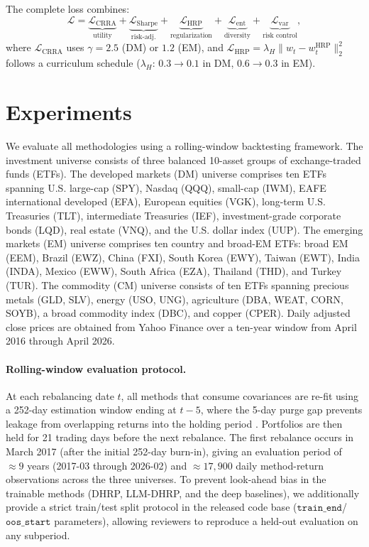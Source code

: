 The complete loss combines:
\begin{equation}
\mathcal{L} = \underbrace{\mathcal{L}_{\text{CRRA}}}_{\text{utility}} + \underbrace{\mathcal{L}_{\text{Sharpe}}}_{\text{risk-adj.}} + \underbrace{\mathcal{L}_{\text{HRP}}}_{\text{regularization}} + \underbrace{\mathcal{L}_{\text{ent}}}_{\text{diversity}} + \underbrace{\mathcal{L}_{\text{var}}}_{\text{risk control}},
\end{equation}
where $\mathcal{L}_{\text{CRRA}}$ uses $\gamma = 2.5$ (DM) or $1.2$ (EM), and $\mathcal{L}_{\text{HRP}} = \lambda_H \|w_t - w_t^{\text{HRP}}\|_2^2$ follows a curriculum schedule ($\lambda_H$: $0.3 \to 0.1$ in DM, $0.6 \to 0.3$ in EM).

\section{Experiments}

We evaluate all methodologies using a rolling-window backtesting framework. The investment universe consists of three balanced 10-asset groups of exchange-traded funds (ETFs). The developed markets (DM) universe comprises ten ETFs spanning U.S. large-cap (SPY), Nasdaq (QQQ), small-cap (IWM), EAFE international developed (EFA), European equities (VGK), long-term U.S. Treasuries (TLT), intermediate Treasuries (IEF), investment-grade corporate bonds (LQD), real estate (VNQ), and the U.S. dollar index (UUP). The emerging markets (EM) universe comprises ten country and broad-EM ETFs: broad EM (EEM), Brazil (EWZ), China (FXI), South Korea (EWY), Taiwan (EWT), India (INDA), Mexico (EWW), South Africa (EZA), Thailand (THD), and Turkey (TUR). The commodity (CM) universe consists of ten ETFs spanning precious metals (GLD, SLV), energy (USO, UNG), agriculture (DBA, WEAT, CORN, SOYB), a broad commodity index (DBC), and copper (CPER). Daily adjusted close prices are obtained from Yahoo Finance over a ten-year window from April 2016 through April 2026.

\paragraph{Rolling-window evaluation protocol.} At each rebalancing date $t$, all methods that consume covariances are re-fit using a 252-day estimation window ending at $t-5$, where the 5-day purge gap prevents leakage from overlapping returns into the holding period \citep{LopezdePrado2018}. Portfolios are then held for 21 trading days before the next rebalance. The first rebalance occurs in March 2017 (after the initial 252-day burn-in), giving an evaluation period of $\approx 9$ years (2017-03 through 2026-02) and $\approx 17{,}900$ daily method-return observations across the three universes. To prevent look-ahead bias in the trainable methods (DHRP, LLM-DHRP, and the deep baselines), we additionally provide a strict train/test split protocol in the released code base ($\texttt{train\_end}$/$\texttt{oos\_start}$ parameters), allowing reviewers to reproduce a held-out evaluation on any subperiod.

